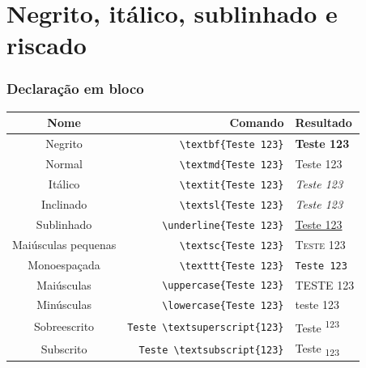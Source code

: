 \documentclass{beamer}
\begin{document}
\section{Negrito, itálico, sublinhado e riscado}
\begin{frame}[fragile]
    \frametitle{Declaração em bloco}

    \begin{table}[h]
        \begin{tabular}{c|r|l}
            Nome & Comando & Resultado \\ \hline 
            Negrito & \lstinline[style=myStyleLatex]!\textbf{Teste 123}! & \textbf{Teste 123} \\ \hline 
            Normal & \lstinline[style=myStyleLatex]!\textmd{Teste 123}! & \textmd{Teste 123} \\ \hline 
            Itálico & \lstinline[style=myStyleLatex]!\textit{Teste 123}! & \textit{Teste 123} \\ \hline 
            Inclinado & \lstinline[style=myStyleLatex]!\textsl{Teste 123}! & \textsl{Teste 123} \\ \hline
            Sublinhado & \lstinline[style=myStyleLatex]!\underline{Teste 123}! & \underline{Teste 123} \\ \hline 
            Maiúsculas pequenas & \lstinline[style=myStyleLatex]!\textsc{Teste 123}! & \textsc{Teste 123} \\ \hline
            Monoespaçada & \lstinline[style=myStyleLatex]!\texttt{Teste 123}! & \texttt{Teste 123} \\ \hline
            Maiúsculas & \lstinline[style=myStyleLatex]!\uppercase{Teste 123}! & \uppercase{Teste 123} \\ \hline 
            Minúsculas & \lstinline[style=myStyleLatex]!\lowercase{Teste 123}! & \lowercase{Teste 123} \\ \hline 
            Sobreescrito & \lstinline[style=myStyleLatex]!Teste \textsuperscript{123}! & Teste \textsuperscript{123} \\ \hline
            Subscrito & \lstinline[style=myStyleLatex]!Teste \textsubscript{123}! & Teste \textsubscript{123} \\ \hline
        \end{tabular}
    \end{table}

\end{frame}
\end{document}
